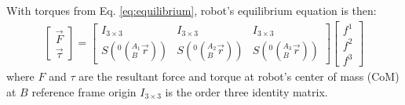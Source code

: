 \documentclass[]{article}
\begin{document}
With torques from Eq. \ref{eq:equilibrium}, robot's equilibrium equation is then:
\begin{eqnarray}
\begin{bmatrix}
\vec{F}\\
\vec{\tau}
\end{bmatrix}
=
\begin{bmatrix}
I_{3\times3}	&I_{3\times3}	&I_{3\times3}	\\
S(^0(_B^{A_1}\vec{r}))	&S(^0(_B^{A_2}\vec{r}))	&S(^0(_B^{A_3}\vec{r}))
\end{bmatrix}
\begin{bmatrix}
f^1	\\
f^2	\\
f^3
\end{bmatrix}
\end{eqnarray}
where $F$ and $\tau$ are the resultant force and torque at robot's center of mass (CoM) at $B$ reference frame origin $I_{3\times3}$ is the order three identity matrix.%
\end{document}
